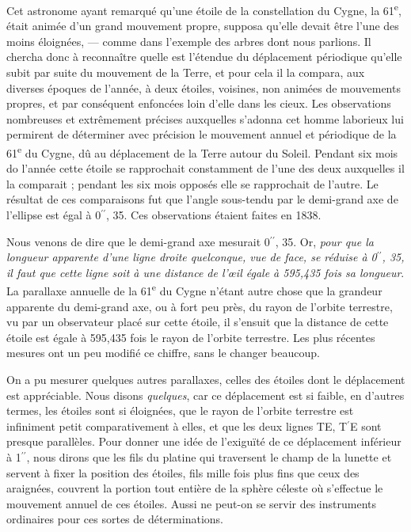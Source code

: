 \documentclass[a4paper, 11pt, oneside, landscape]{article}
\begin{document}
Cet astronome ayant remarqué qu'une étoile de la constellation du Cygne, la 61\textsuperscript{e}, était animée d'un grand mouvement propre, supposa qu'elle devait être l'une des moins éloignées, --- comme dans l'exemple des arbres dont nous parlions. Il chercha donc à reconnaître quelle est l'étendue du déplacement périodique qu'elle subit par suite du mouvement de la Terre, et pour cela il la compara, aux diverses époques de l'année, à deux étoiles, voisines, non animées de mouvements propres, et par conséquent enfoncées loin d'elle dans les cieux. Les observations nombreuses et extrêmement précises auxquelles s'adonna cet homme laborieux lui permirent de déterminer avec précision le mouvement annuel et périodique de la 61\textsuperscript{e} du Cygne, dû au déplacement de la Terre autour du Soleil. Pendant six mois do l'année cette étoile se rapprochait constamment de l'une des deux auxquelles il la comparait ; pendant les six mois opposés elle se rapprochait de l'autre. Le résultat de ces comparaisons fut que l'angle sous-tendu par le demi-grand axe de l'ellipse est égal à 0$^{\prime\prime}$, 35. Ces observations étaient faites en 1838.

Nous venons de dire que le demi-grand axe mesurait 0$^{\prime\prime}$, 35. Or, \emph{pour que la longueur apparente d'une ligne droite quelconque, vue de face, se réduise à 0$^{\prime\prime}$, 35, il faut que cette ligne soit à une distance de l'œil égale à 595,435 fois sa longueur}. La parallaxe annuelle de la 61\textsuperscript{e} du Cygne n'étant autre chose que la grandeur apparente du demi-grand axe, ou à fort peu près, du rayon de l'orbite terrestre, vu par un observateur placé sur cette étoile, il s'ensuit que la distance de cette étoile est égale à 595,435 fois le rayon de l'orbite terrestre. Les plus récentes mesures ont un peu modifié ce chiffre, sans le changer beaucoup.

On a pu mesurer quelques autres parallaxes, celles des étoiles dont le déplacement est appréciable. Nous disons \emph{quelques}, car ce déplacement est si faible, en d'autres termes, les étoiles sont si éloignées, que le rayon de l'orbite terrestre est infiniment petit comparativement à elles, et que les deux lignes TE, T$^{\prime}$E sont presque parallèles. Pour donner une idée de l'exiguïté de ce déplacement inférieur à 1$^{\prime\prime}$, nous dirons que les fils du platine qui traversent le champ de la lunette et servent à fixer la position des étoiles, fils mille fois plus fins que ceux des araignées, couvrent la portion tout entière de la sphère céleste où s'effectue le mouvement annuel de ces étoiles. Aussi ne peut-on se servir des instruments ordinaires pour ces sortes de déterminations.
\end{document}
